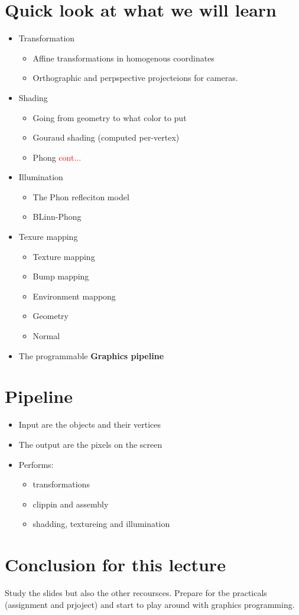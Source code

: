 \section{Quick look at what we will learn}
\begin{itemize}
	\item Transformation
	\begin{itemize}
		\item Affine transformations in homogenous coordinates
		\item Orthographic and perpspective projecteions for cameras.
	\end{itemize}
	\item Shading
	\begin{itemize}
		\item Going from geometry to what color to put 
		\item Gouraud shading (computed per-vertex)
		\item Phong \textcolor{red}{cont...} 
	\end{itemize}
	\item Illumination
	\begin{itemize}
		\item The Phon refleciton model
		\item BLinn-Phong
	\end{itemize}
	\item Texure mapping
	\begin{itemize}
		\item Texture mapping
		\item Bump mapping
		\item Environment mappong
		\item Geometry
		\item Normal
	\end{itemize}
	\item The programmable \textbf{Graphics pipeline}
\end{itemize}



\section{Pipeline}
\begin{itemize}
	\item Input are the objects and their vertices
	\item The output are the pixels on the screen
	\item Performs:
	\begin{itemize}
		\item transformations
		\item clippin and assembly
		\item shadding, textureing and illumination
	\end{itemize}
\end{itemize}

\section{Conclusion for this lecture}
Study the slides but also the other recoursces. Prepare for tbe practicals (assignment and prjoject) and start to play around with graphics programming.   


